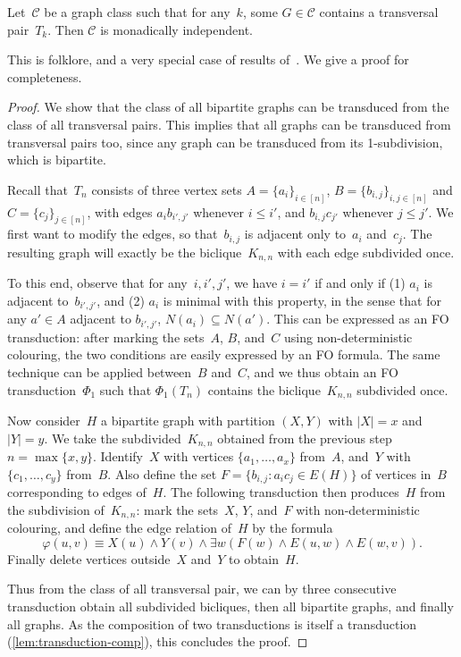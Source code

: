 \documentclass[a4paper,UKenglish,cleveref,thm-restate]{lipics-v2021}
\theoremstyle{remark}
\newcommand{\Cc}{\mathcal{C}}
\begin{document}
\begin{lemma}\label{lem:transversal-pair-NIP}
    Let~$\Cc$ be a graph class such that for any~$k$, some $G \in \Cc$ contains a transversal pair~$T_k$. Then $\Cc$ is monadically independent.
\end{lemma}
This is folklore, and a very special case of results of~\cite{flip-breakability}.
We give a proof for completeness.%
\begin{proof}
    We show that the class of all bipartite graphs can be transduced from the class of all transversal pairs.
    This implies that all graphs can be transduced from transversal pairs too,
    since any graph can be transduced from its 1-subdivision, which is bipartite.

    Recall that~$T_n$ consists of three vertex sets $A = \{a_i\}_{i \in [n]}$, $B = \{b_{i,j}\}_{i,j \in [n]}$ and $C = \{c_j\}_{j \in [n]}$,
    with edges $a_ib_{i',j'}$ whenever $i \le i'$, and $b_{i,j}c_{j'}$ whenever $j \le j'$.
    We first want to modify the edges, so that~$b_{i,j}$ is adjacent only to~$a_i$ and~$c_j$.
    The resulting graph will exactly be the biclique~$K_{n,n}$ with each edge subdivided once.

    To this end, observe that for any~$i,i',j'$, we have $i=i'$ if and only if (1) $a_i$ is adjacent to~$b_{i',j'}$,
    and (2) $a_i$ is minimal with this property, in the sense that for any $a' \in A$ adjacent to $b_{i',j'}$, $N(a_i) \subseteq N(a')$.
    This can be expressed as an FO transduction:
    after marking the sets~$A$, $B$, and~$C$ using non-deterministic colouring, the two conditions are easily expressed by an FO formula.
    The same technique can be applied between~$B$ and~$C$,
    and we thus obtain an FO transduction~$\Phi_1$ such that $\Phi_1(T_n)$ contains the biclique~$K_{n,n}$ subdivided once.

    Now consider~$H$ a bipartite graph with partition $(X,Y)$ with $|X| = x$ and $|Y| = y$.
    We take the subdivided~$K_{n,n}$ obtained from the previous step $n = \max\{x, y\}$.
    Identify~$X$ with vertices $\{a_1,\dots,a_x\}$ from~$A$, and~$Y$ with $\{c_1,\dots,c_y\}$ from~$B$.
    Also define the set $F = \{b_{i,j} : a_ic_j \in E(H)\}$ of vertices in~$B$ corresponding to edges of~$H$.
    The following transduction then produces~$H$ from the subdivision of~$K_{n,n}$:
    mark the sets~$X$, $Y$, and~$F$ with non-deterministic colouring,
    and define the edge relation of~$H$ by the formula
    \[ \varphi(u, v) \equiv X(u) \land Y(v) \land \exists w (F(w) \land E(u, w) \land E(w, v)). \]
    Finally delete vertices outside~$X$ and~$Y$ to obtain~$H$.

    Thus from the class of all transversal pair, we can by three consecutive transduction obtain all subdivided bicliques, then all bipartite graphs, and finally all graphs.
    As the composition of two transductions is itself a transduction (\cref{lem:transduction-comp}), this concludes the proof.
\end{proof}
\end{document}
